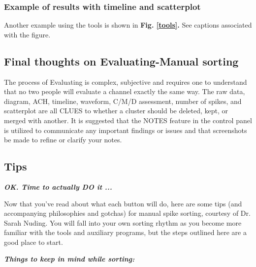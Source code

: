 \documentclass[12pt]{article}
\begin{document}
\subsubsection{Example of results with timeline and scatterplot}
Another example using the tools is shown in \textbf{Fig. \ref{tools}.}
See captions associated with the figure.
\begin{center}
  \label{tools}
\end{center}

\subsection{Final thoughts on Evaluating-Manual sorting}
The process of Evaluating is complex, subjective and requires one to
understand that no two people will evaluate a channel exactly the same
way. The raw data, diagram, ACH, timeline, waveform, C/M/D assessment,
number of spikes, and scatterplot are all CLUES to whether a cluster
should be deleted, kept, or merged with another. It is suggested that
the {\sf NOTES} feature in the control panel is utilized to
communicate any important findings or issues and that screenshots be
made to refine or clarify your notes.

\subsection{Tips}

{\bfseries\itshape OK. Time to actually DO it ...}

Now that you've read about what each button will do, here are some
tips (and accompanying philosophies and gotchas) for manual spike
sorting, courtesy of Dr. Sarah Nuding. You will fall into your own
sorting rhythm as you become more familiar with the tools and
auxiliary programs, but the steps outlined here are a good place to
start.

\textbf{\textit{Things to keep in mind while sorting:}}
\end{document}
